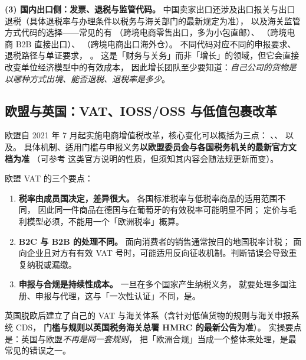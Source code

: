 \textbf{(3) 国内出口侧：发票、退税与监管代码。}
中国卖家出口还涉及出口报关与出口退税（具体退税率与办理条件以税务与海关部门的最新规定为准），
以及海关监管方式代码的选择——常见的有
（跨境电商零售出口，多为小包直邮）、
（跨境电商 B2B 直接出口）、
（跨境电商出口海外仓）。
不同代码对应不同的申报要求、退税路径与单证要求，
。
这是「财务与关务」而非「增长」的领域，但它会直接改变单位经济模型中的有效成本，
因此增长团队至少要知道：\emph{自己公司的货物是以哪种方式出境、能否退税、退税率是多少}。

\subsection{欧盟与英国：VAT、IOSS/OSS 与低值包裹改革}

欧盟自 2021 年 7 月起实施电商增值税改革，核心变化可以概括为三点：
、、
以及。
具体机制、适用门槛与申报义务\textbf{以欧盟委员会与各国税务机关的最新官方文档为准}
（可参考 \cite{eu_oss} 这类官方说明的性质，但须知其内容会随法规更新而变）。

欧盟 VAT 的三个要点：

\begin{enumerate}
  \item \textbf{税率由成员国决定，差异很大。} 各国标准税率与低税率商品的适用范围不同，
        因此同一件商品在德国与在葡萄牙的有效税率可能明显不同；
        定价与毛利模型必须，不能用一个「欧洲税率」概算。
  \item \textbf{B2C 与 B2B 的处理不同。} 面向消费者的销售通常按目的地国税率计税；
        面向企业且对方有有效 VAT 号时，可能适用反向征收机制。判断错误会导致重复纳税或漏缴。
  \item \textbf{申报与合规是持续性成本。} 一旦在多个国家产生纳税义务，
        就要处理多国注册、申报与代理，这与「一次性认证」不同，是。
\end{enumerate}

英国脱欧后建立了自己的 VAT 与海关体系（含针对低值货物的规则与海关申报系统 CDS，
\textbf{门槛与规则以英国税务海关总署 HMRC 的最新公告为准}）。
实操要点是：英国与欧盟\emph{不再是同一套规则}，
把「欧洲合规」当成一个整体来处理，是最常见的错误之一。

